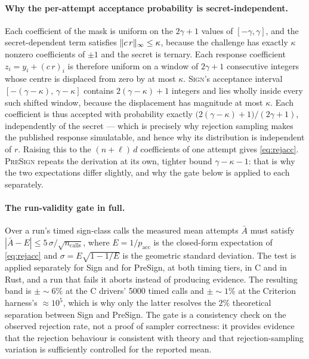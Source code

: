 \paragraph{Why the per-attempt acceptance probability is secret-independent.}
Each coefficient of the mask is uniform on the $2\gamma+1$ values of
$[-\gamma,\gamma]$, and the secret-dependent term satisfies
$\lVert c\,r \rVert_\infty\le\kappa$, because the challenge has exactly $\kappa$ nonzero
coefficients of $\pm1$ and the secret is ternary. Each response coefficient
$z_i = y_i + (c\,r)_i$ is therefore uniform on a window of $2\gamma+1$ consecutive
integers whose centre is displaced from zero by at most $\kappa$. \textsc{Sign}'s acceptance
interval $[-(\gamma-\kappa),\,\gamma-\kappa]$ contains $2(\gamma-\kappa)+1$ integers and
lies wholly inside every such shifted window, because the displacement has magnitude at
most $\kappa$. Each coefficient is thus accepted with probability exactly
$\bigl(2(\gamma-\kappa)+1\bigr)/(2\gamma+1)$, independently of the secret --- which is
precisely why rejection sampling makes the published response simulatable, and hence
why its distribution is independent of $r$. Raising this to the $(n+\ell)\,d$ coefficients of one
attempt gives \cref{eq:rejacc}. \textsc{PreSign} repeats the derivation at its own,
tighter bound $\gamma-\kappa-1$: that is why the two expectations differ slightly, and
why the gate below is applied to each separately.

\paragraph{The run-validity gate in full.}
Over a run's timed sign-class calls the measured mean attempts $\bar{A}$ must satisfy
$|\bar{A} - E| \le 5\,\sigma/\sqrt{n_{\mathrm{calls}}}$, where $E=1/p_{\mathrm{acc}}$
is the closed-form expectation of \cref{eq:rejacc} and $\sigma = E\sqrt{1-1/E}$ is the
geometric standard deviation. The test is applied separately for Sign and for PreSign,
at both timing tiers, in C and in Rust, and a run that fails it aborts instead of
producing evidence. The resulting band is $\pm\!\sim\!6\%$ at the C drivers' 5000
timed calls and $\pm\!\sim\!1\%$ at the Criterion harness's $\approx\!10^5$, which is
why only the latter resolves the $2\%$ theoretical separation between Sign and
PreSign. The gate is a consistency check on the observed rejection rate, not a proof
of sampler correctness: it provides evidence that the rejection behaviour is
consistent with theory and that rejection-sampling variation is sufficiently
controlled for the reported mean.

